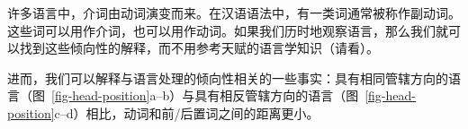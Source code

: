许多语言中，介词由动词演变而来。在汉语语法中，有一类词通常被称作副动词。这些词可以用作介词，也可以用作动词。如果我们历时地观察语言，那么我们就可以找到这些倾向性的解释，而不用参考天赋的语言学知识（请看\citealp[]{EL2009a}）。

进而，我们可以解释与语言处理的倾向性相关的一些事实：具有相同管辖方向的语言（图~\ref{fig-head-position}a--b）与具有相反管辖方向的语言（图~\ref{fig-head-position}c--d）相比，动词和前/后置词之间的距离更小。
